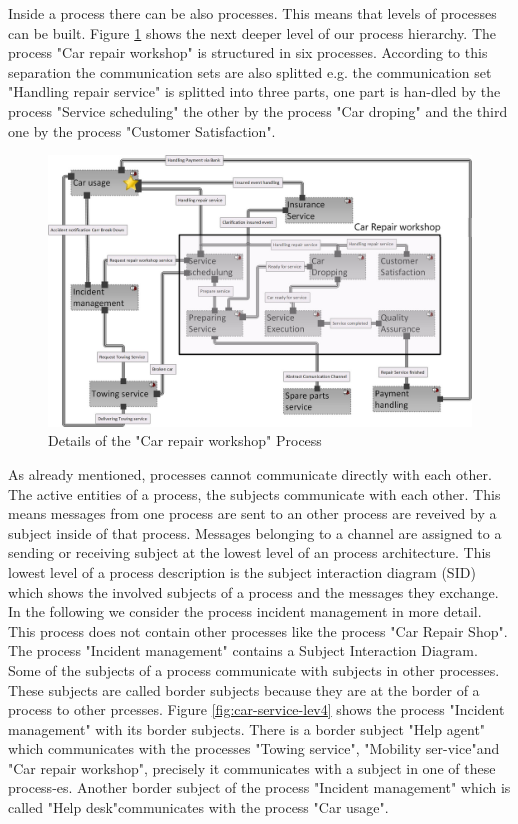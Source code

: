 Inside a process there can be also processes. This means that levels of processes can be built. Figure \ref{fig:car-service-lev3} shows the next deeper level of our process hierarchy. The process "Car repair workshop" is structured in six processes. According to this separation the communication sets are also splitted e.g. the communication set "Handling repair service" is splitted into three parts, one part is han-dled by the process "Service scheduling" the other by the process "Car droping" and the third one by the process "Customer Satisfaction".\\

\begin{figure}
	\centering
	\includegraphics[width=0.8\linewidth]{Figures/Chapter5/figures-hierarchy/Car-Service-Lev3}
	\caption[Details of the "Car repair workshop" Process]{Details of the "Car repair workshop" Process}
	\label{fig:car-service-lev3}
\end{figure}

As already mentioned, processes cannot communicate directly with each other. The active entities of a process, the subjects communicate with each other. This means messages from one process are sent to an other process are reveived by a subject inside of that process. Messages belonging to a channel are assigned to a sending or receiving subject at the lowest level of an process architecture. This lowest level of a process description is the subject interaction diagram (SID) which shows the involved subjects of a process and the messages they exchange. In the following we consider the process incident management in more detail. This process does not contain other processes like the process "Car Repair Shop". The process "Incident management" contains a Subject Interaction Diagram. Some of the subjects of a process communicate with subjects in other processes. These subjects are called border subjects because they are at the border of a process to other prcesses. Figure \ref{fig:car-service-lev4} shows the process "Incident management" with its border subjects. There is a border subject "Help agent" which communicates with the processes "Towing service", "Mobility ser-vice"and  "Car repair workshop", precisely it communicates with a subject in one of these process-es. Another border subject of the process "Incident management" which is called "Help desk"communicates with the process "Car usage".\\

